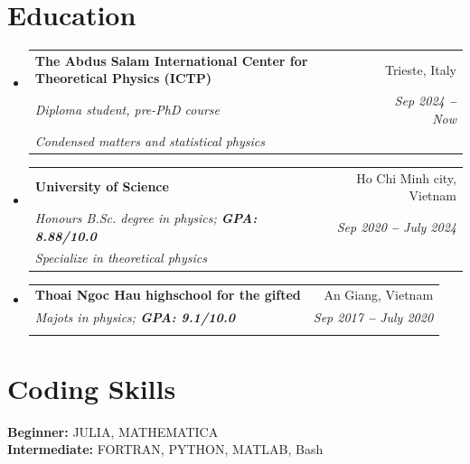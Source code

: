 \documentclass[letterpaper,11pt]{article}
\makeatletter
\newcommand{\resumeSubheading}[4]{
	\vspace{-2pt}\item
	\begin{tabular*}{0.97\textwidth}[t]{l@{\extracolsep{\fill}}r}
		\textbf{#1} & #2 \\
		\textit{\small#3} & \textit{\small #4} \\
	\end{tabular*}\vspace{-7pt}
}
\newcommand{\resumeEducationHeading}[6]{
	\vspace{-2pt}\item
	\begin{tabular*}{0.97\textwidth}[t]{l@{\extracolsep{\fill}}r}
		\textbf{#1} & #2 \\
		\textit{\small#3} & \textit{\small #4} \\
		\textit{\small#5} & \textit{\small #6} \\
	\end{tabular*}\vspace{-5pt}
}
\newcommand{\resumeSubHeadingListStart}{\begin{itemize}[leftmargin=0.15in, label={}]}
\newcommand{\resumeSubHeadingListEnd}{\end{itemize}}
\makeatother
\begin{document}
	\section{Education}
	\vspace{3pt}
	\resumeSubHeadingListStart
	\resumeEducationHeading
	{The Abdus Salam International Center for Theoretical Physics (ICTP)
	}{Trieste, Italy}
	{Diploma student, pre-PhD course}{Sep 2024 \textbf{--} Now}
	{Condensed matters and statistical physics}{}
	\resumeEducationHeading
	{University of Science
	}{Ho Chi Minh city, Vietnam}
	{Honours B.Sc. degree in physics;   \textbf{GPA: 8.88/10.0}}{Sep 2020 \textbf{--} July 2024}
	{Specialize in theoretical physics}{}
	\resumeEducationHeading
	{Thoai Ngoc Hau highschool for the gifted
	}{An Giang, Vietnam}
	{Majots in physics;   \textbf{GPA: 9.1/10.0}}{Sep 2017 \textbf{--} July 2020}
	{}{}
	
	
	\resumeSubHeadingListEnd
	
	
	
	
	\section{Coding Skills}
	\vspace{2pt}
	\resumeSubHeadingListStart
	\small{\item{
	\textbf{Beginner:}{ JULIA, MATHEMATICA} \\ \vspace{3pt}
	\textbf{Intermediate:}{ FORTRAN, PYTHON, MATLAB, Bash}
			
			
	}}
	\resumeSubHeadingListEnd
\end{document}
